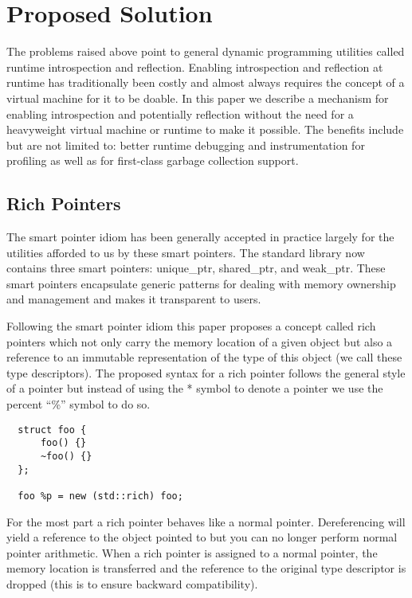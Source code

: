 \documentclass[10pt,a4paper]{article}
\begin{document}
\section{Proposed Solution}

The problems raised above point to general dynamic programming utilities called
runtime introspection and reflection. Enabling introspection and reflection at
runtime has traditionally been costly and almost always requires the concept of
a virtual machine for it to be doable. In this paper we describe a mechanism for
enabling introspection and potentially reflection without the need for a
heavyweight virtual machine or runtime to make it possible. The benefits include
but are not limited to: better runtime debugging and instrumentation for
profiling as well as for first-class garbage collection support.

\subsection{Rich Pointers}

The smart pointer idiom has been generally accepted in practice largely for the
utilities afforded to us by these smart pointers. The standard library now
contains three smart pointers: unique\_ptr, shared\_ptr, and weak\_ptr. These
smart pointers encapsulate generic patterns for dealing with memory ownership
and management and makes it transparent to users.

Following the smart pointer idiom this paper proposes a concept called rich
pointers which not only carry the memory location of a given object but also a
reference to an immutable representation of the type of this object (we call
these type descriptors). The proposed syntax for a rich pointer follows the
general style of a pointer but instead of using the * symbol to denote a pointer
we use the percent ``\%'' symbol to do so.

\begin{verbatim}
  struct foo {
      foo() {}
      ~foo() {}
  };

  foo %p = new (std::rich) foo;
\end{verbatim}

For the most part a rich pointer behaves like a normal pointer. Dereferencing
will yield a reference to the object pointed to but you can no longer perform
normal pointer arithmetic. When a rich pointer is assigned to a normal pointer,
the memory location is transferred and the reference to the original type
descriptor is dropped (this is to ensure backward compatibility).
\end{document}
